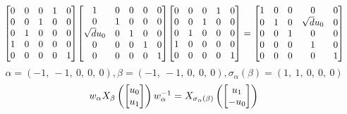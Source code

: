 \documentclass[11pt]{article}
\theoremstyle{definition}
\begin{document}
\[
\scaletoalign{\textwidth}{{\left[\begin{matrix}0 & 0 & 0 & 1 & 0\\0 & 0 & 1 & 0 & 0\\0 & 1 & 0 & 0 & 0\\1 & 0 & 0 & 0 & 0\\0 & 0 & 0 & 0 & 1\end{matrix}\right]} {\left[\begin{matrix}1 & 0 & 0 & 0 & 0\\0 & 1 & 0 & 0 & 0\\\sqrt{d} u_{0} & 0 & 1 & 0 & 0\\0 & 0 & 0 & 1 & 0\\0 & 0 & 0 & 0 & 1\end{matrix}\right]} {\left[\begin{matrix}0 & 0 & 0 & 1 & 0\\0 & 0 & 1 & 0 & 0\\0 & 1 & 0 & 0 & 0\\1 & 0 & 0 & 0 & 0\\0 & 0 & 0 & 0 & 1\end{matrix}\right]} = {\left[\begin{matrix}1 & 0 & 0 & 0 & 0\\0 & 1 & 0 & \sqrt{d} u_{0} & 0\\0 & 0 & 1 & 0 & 0\\0 & 0 & 0 & 1 & 0\\0 & 0 & 0 & 0 & 1\end{matrix}\right]}}
\]
\[
\alpha = \left( -1, \  -1, \  0, \  0, \  0\right), \beta = \left( -1, \  -1, \  0, \  0, \  0\right), \sigma_{\alpha}(\beta) = \left( 1, \  1, \  0, \  0, \  0\right)
\]
\[
\scaletoalign{\textwidth}{w_{\alpha} X_{\beta}\left(\left[\begin{matrix}u_{0}\\u_{1}\end{matrix}\right]\right) w_{\alpha}^{-1} = X_{\sigma_{\alpha}\left(\beta\right)}\left(\left[\begin{matrix}u_{1}\\- u_{0}\end{matrix}\right]\right)}
\]
\end{document}
